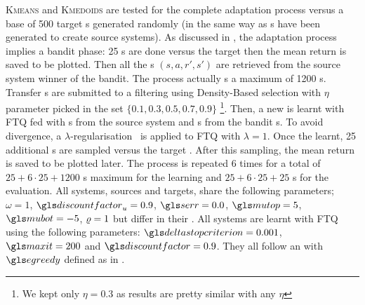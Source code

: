 \textsc{Kmeans} and \textsc{Kmedoids} are tested for the complete adaptation process versus a base of 500 target s generated randomly (in the same way as s have been generated to create source systems). As discussed in , the adaptation process implies a bandit phase: 25 s are done versus the target  then the mean return is saved to be plotted. Then all the s $(s, a, r', s')$ are retrieved from the source system winner of the bandit. The process actually s a maximum of 1200 s. Transfer s are submitted to a filtering using Density-Based selection with $\eta$ parameter picked in the set $\{0.1,0.3,0.5,0.7,0.9\}$ \footnote{We kept only $\eta=0.3$ as results are pretty similar with any $\eta$}. Then, a new  is learnt with \gls{FTQ} fed with s from the source system and s from the bandit s. To avoid divergence, a $\lambda$-regularisation~\parencite{Tikhonov1963,Massoud2009} is applied to \gls{FTQ} with $\lambda=1$. Once the  learnt, 25 additional s are sampled versus the target . After this sampling, the mean return is saved to be plotted later. The process is repeated 6 times for a total of $25+6\cdot 25+1200$ s maximum for the learning and $25+6\cdot 25+25$ s for the evaluation. All systems, sources and targets, share the following parameters; $\omega=1$, $\discountfactor_u=0.9$, $\ser=0.0$, $\mutop=5$, $\mubot=-5$, $\varrho=1$  but differ in their . All systems are learnt with \gls{FTQ} using the following parameters: $\deltastoppingcriterion=0.001$, $\maxiteration=200$ and $\discountfactor=0.9$. They all follow an   with $\egreedy$ defined as in .

